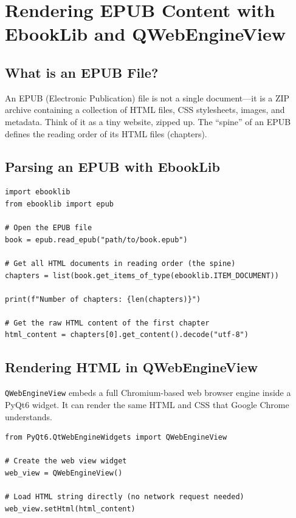 \documentclass[12pt,oneside]{book}
\begin{document}
\chapter{Rendering EPUB Content with EbookLib and QWebEngineView}
\label{ch:epub}

\section{What is an EPUB File?}

An EPUB (Electronic Publication) file is not a single document—it is a ZIP archive
containing a collection of HTML files, CSS stylesheets, images, and metadata. Think of it
as a tiny website, zipped up. The ``spine'' of an EPUB defines the reading order of its
HTML files (chapters).

\section{Parsing an EPUB with EbookLib}

\begin{lstlisting}[caption={Opening an EPUB and iterating chapters (LLR-07)}]
import ebooklib
from ebooklib import epub

# Open the EPUB file
book = epub.read_epub("path/to/book.epub")

# Get all HTML documents in reading order (the spine)
chapters = list(book.get_items_of_type(ebooklib.ITEM_DOCUMENT))

print(f"Number of chapters: {len(chapters)}")

# Get the raw HTML content of the first chapter
html_content = chapters[0].get_content().decode("utf-8")
\end{lstlisting}

\section{Rendering HTML in QWebEngineView}

\texttt{QWebEngineView} embeds a full Chromium-based web browser engine inside a PyQt6
widget. It can render the same HTML and CSS that Google Chrome understands.

\begin{lstlisting}[caption={Rendering EPUB HTML in QWebEngineView (LLR-08)}]
from PyQt6.QtWebEngineWidgets import QWebEngineView

# Create the web view widget
web_view = QWebEngineView()

# Load HTML string directly (no network request needed)
web_view.setHtml(html_content)
\end{lstlisting}
\end{document}
